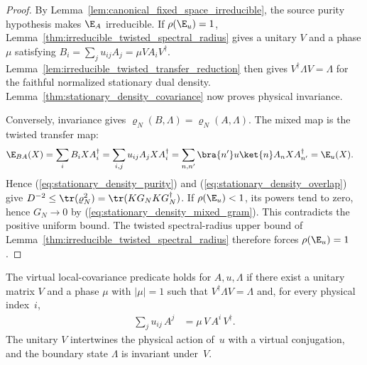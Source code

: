 \begin{proof}
    \leanok
    By Lemma~\ref{lem:canonical_fixed_space_irreducible}, the source purity
    hypothesis makes $\E_A$ irreducible.
    If $\rho(\E_u)=1$, Lemma~\ref{thm:irreducible_twisted_spectral_radius}
    gives a unitary $V$ and a phase $\mu$ satisfying
    $B_i=\sum_j u_{ij}A_j=\mu VA_iV^\dagger$.
    Lemma~\ref{lem:irreducible_twisted_transfer_reduction} then gives
    $V^\dagger\Lambda V=\Lambda$ for the faithful normalized stationary
    dual density.
    Lemma~\ref{thm:stationary_density_covariance} now proves physical
    invariance.

    Conversely, invariance gives $\varrho_N(B,\Lambda)=\varrho_N(A,\Lambda)$.
    The mixed map is the twisted transfer map:
    \begin{align}
        \E_{BA}(X)
         & =\sum_iB_iXA_i^\dagger
        =\sum_{i,j}u_{ij}A_jXA_i^\dagger
        =\sum_{n,n'}\bra{n'}u\ket{n}A_nXA_{n'}^\dagger
        =\E_u(X).
        \notag
    \end{align}
    Hence
    (\ref{eq:stationary_density_purity}) and
    (\ref{eq:stationary_density_overlap}) give
    $D^{-2}\leq\tr(\varrho_N^2)=\tr(KG_NKG_N^\dagger)$.
    If $\rho(\E_u)<1$, its powers tend to zero, hence
    $G_N\to0$ by (\ref{eq:stationary_density_mixed_gram}). This contradicts
    the positive uniform bound. The twisted spectral-radius upper bound of
    Lemma~\ref{thm:irreducible_twisted_spectral_radius} therefore forces
    $\rho(\E_u)=1$.
\end{proof}

\begin{definition}\label{def:local_symmetry}
    \leanok
    The virtual local-covariance predicate holds for $A,u,\Lambda$ if
    there exist a unitary
    matrix $V$ and a phase $\mu$ with $|\mu| = 1$ such that
    $V^\dagger \Lambda V = \Lambda$ and, for every physical index~$i$,
    \begin{align}
        \sum_j u_{ij}\, A^j
         & = \mu\, V\, A^i\, V^\dagger.
        \label{eq:symmetry_local_covariance}
    \end{align}
    The unitary $V$ intertwines the physical action of~$u$ with a virtual
    conjugation, and the boundary state $\Lambda$ is invariant under~$V$.
\end{definition}

